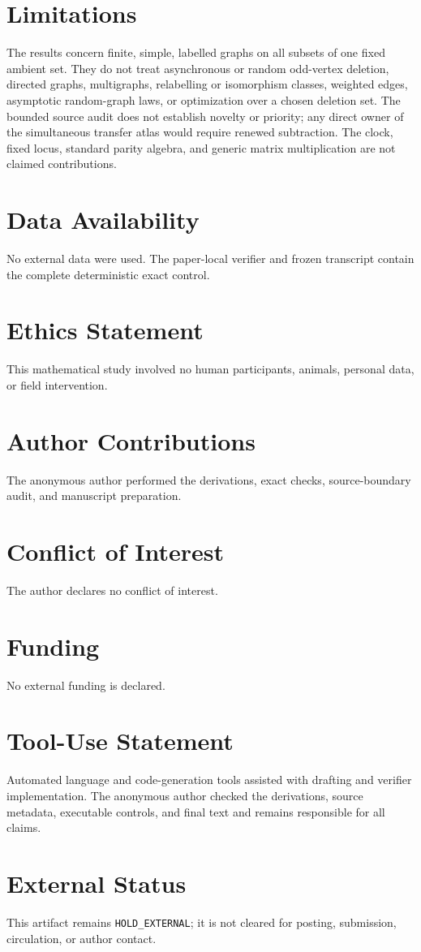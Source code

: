 \documentclass[a4paper,10pt]{amsart}
\theoremstyle{remark}
\begin{document}
\section*{Limitations}
The results concern finite, simple, labelled graphs on all subsets of one
fixed ambient set.  They do not treat asynchronous or random odd-vertex
deletion, directed graphs, multigraphs, relabelling or isomorphism classes,
weighted edges, asymptotic random-graph laws, or optimization over a chosen
deletion set.  The bounded source audit does not establish novelty or priority;
any direct owner of the simultaneous transfer atlas would require renewed
subtraction.  The clock, fixed locus, standard parity algebra, and generic
matrix multiplication are not claimed contributions.

\section*{Data Availability}
No external data were used.  The paper-local verifier and frozen transcript
contain the complete deterministic exact control.

\section*{Ethics Statement}
This mathematical study involved no human participants, animals, personal
data, or field intervention.

\section*{Author Contributions}
The anonymous author performed the derivations, exact checks, source-boundary
audit, and manuscript preparation.

\section*{Conflict of Interest}
The author declares no conflict of interest.

\section*{Funding}
No external funding is declared.

\section*{Tool-Use Statement}
Automated language and code-generation tools assisted with drafting and
verifier implementation.  The anonymous author checked the derivations,
source metadata, executable controls, and final text and remains responsible
for all claims.

\section*{External Status}
This artifact remains \texttt{HOLD\_EXTERNAL}; it is not cleared for
posting, submission, circulation, or author contact.



\end{document}

